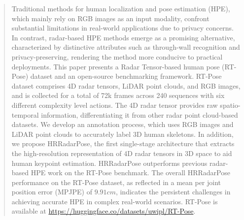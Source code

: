 \begin{abstract}
Traditional methods for human localization and pose estimation (HPE), which mainly rely on RGB images as an input modality, confront substantial limitations in real-world applications due to privacy concerns. In contrast, radar-based HPE methods emerge as a promising alternative, characterized by distinctive attributes such as through-wall recognition and privacy-preserving, rendering the method more conducive to practical deployments. This paper presents a Radar Tensor-based human pose (RT-Pose) dataset and an open-source benchmarking framework. RT-Pose dataset comprises 4D radar tensors, LiDAR point clouds, and RGB images, and is collected for a total of 72k frames across 240 sequences with six different complexity level actions. The 4D radar tensor provides raw spatio-temporal information, differentiating it from other radar point cloud-based datasets. 
We develop an annotation process, which uses RGB images and LiDAR point clouds to accurately label 3D human skeletons.
In addition, we propose HRRadarPose, the first single-stage architecture that extracts the high-resolution representation of 4D radar tensors in 3D space to aid human keypoint estimation.
HRRadarPose outperforms previous radar-based HPE work on the RT-Pose benchmark. 
The overall HRRadarPose performance on the RT-Pose dataset, as reflected in a mean per joint position error (MPJPE) of $9.91 cm$,  indicates the persistent challenges in achieving accurate HPE in complex real-world scenarios. RT-Pose is available at \url{https://huggingface.co/datasets/uwipl/RT-Pose}.


\end{abstract}

